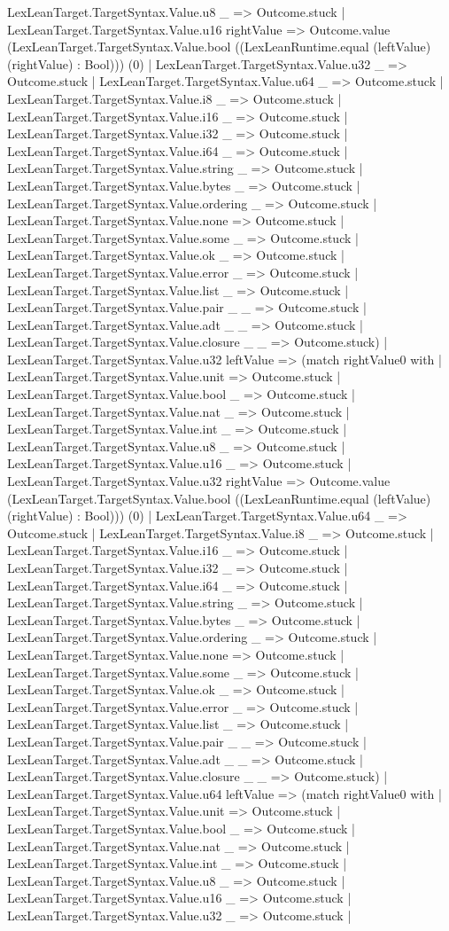 \documentclass[11pt]{article}
\begin{document}
LexLeanTarget.TargetSyntax.Value.u8 \_ => Outcome.stuck | LexLeanTarget.TargetSyntax.Value.u16 rightValue => Outcome.value (LexLeanTarget.TargetSyntax.Value.bool ((LexLeanRuntime.equal (leftValue) (rightValue) : Bool))) (0) | LexLeanTarget.TargetSyntax.Value.u32 \_ => Outcome.stuck | LexLeanTarget.TargetSyntax.Value.u64 \_ => Outcome.stuck | LexLeanTarget.TargetSyntax.Value.i8 \_ => Outcome.stuck | LexLeanTarget.TargetSyntax.Value.i16 \_ => Outcome.stuck | LexLeanTarget.TargetSyntax.Value.i32 \_ => Outcome.stuck | LexLeanTarget.TargetSyntax.Value.i64 \_ => Outcome.stuck | LexLeanTarget.TargetSyntax.Value.string \_ => Outcome.stuck | LexLeanTarget.TargetSyntax.Value.bytes \_ => Outcome.stuck | LexLeanTarget.TargetSyntax.Value.ordering \_ => Outcome.stuck | LexLeanTarget.TargetSyntax.Value.none => Outcome.stuck | LexLeanTarget.TargetSyntax.Value.some \_ => Outcome.stuck | LexLeanTarget.TargetSyntax.Value.ok \_ => Outcome.stuck | LexLeanTarget.TargetSyntax.Value.error \_ => Outcome.stuck | LexLeanTarget.TargetSyntax.Value.list \_ => Outcome.stuck | LexLeanTarget.TargetSyntax.Value.pair \_ \_ => Outcome.stuck | LexLeanTarget.TargetSyntax.Value.adt \_ \_ => Outcome.stuck | LexLeanTarget.TargetSyntax.Value.closure \_ \_ => Outcome.stuck) | LexLeanTarget.TargetSyntax.Value.u32 leftValue => (match rightValue0 with | LexLeanTarget.TargetSyntax.Value.unit => Outcome.stuck | LexLeanTarget.TargetSyntax.Value.bool \_ => Outcome.stuck | LexLeanTarget.TargetSyntax.Value.nat \_ => Outcome.stuck | LexLeanTarget.TargetSyntax.Value.int \_ => Outcome.stuck | LexLeanTarget.TargetSyntax.Value.u8 \_ => Outcome.stuck | LexLeanTarget.TargetSyntax.Value.u16 \_ => Outcome.stuck | LexLeanTarget.TargetSyntax.Value.u32 rightValue => Outcome.value (LexLeanTarget.TargetSyntax.Value.bool ((LexLeanRuntime.equal (leftValue) (rightValue) : Bool))) (0) | LexLeanTarget.TargetSyntax.Value.u64 \_ => Outcome.stuck | LexLeanTarget.TargetSyntax.Value.i8 \_ => Outcome.stuck | LexLeanTarget.TargetSyntax.Value.i16 \_ => Outcome.stuck | LexLeanTarget.TargetSyntax.Value.i32 \_ => Outcome.stuck | LexLeanTarget.TargetSyntax.Value.i64 \_ => Outcome.stuck | LexLeanTarget.TargetSyntax.Value.string \_ => Outcome.stuck | LexLeanTarget.TargetSyntax.Value.bytes \_ => Outcome.stuck | LexLeanTarget.TargetSyntax.Value.ordering \_ => Outcome.stuck | LexLeanTarget.TargetSyntax.Value.none => Outcome.stuck | LexLeanTarget.TargetSyntax.Value.some \_ => Outcome.stuck | LexLeanTarget.TargetSyntax.Value.ok \_ => Outcome.stuck | LexLeanTarget.TargetSyntax.Value.error \_ => Outcome.stuck | LexLeanTarget.TargetSyntax.Value.list \_ => Outcome.stuck | LexLeanTarget.TargetSyntax.Value.pair \_ \_ => Outcome.stuck | LexLeanTarget.TargetSyntax.Value.adt \_ \_ => Outcome.stuck | LexLeanTarget.TargetSyntax.Value.closure \_ \_ => Outcome.stuck) | LexLeanTarget.TargetSyntax.Value.u64 leftValue => (match rightValue0 with | LexLeanTarget.TargetSyntax.Value.unit => Outcome.stuck | LexLeanTarget.TargetSyntax.Value.bool \_ => Outcome.stuck | LexLeanTarget.TargetSyntax.Value.nat \_ => Outcome.stuck | LexLeanTarget.TargetSyntax.Value.int \_ => Outcome.stuck | LexLeanTarget.TargetSyntax.Value.u8 \_ => Outcome.stuck | LexLeanTarget.TargetSyntax.Value.u16 \_ => Outcome.stuck | LexLeanTarget.TargetSyntax.Value.u32 \_ => Outcome.stuck | 
\end{document}
